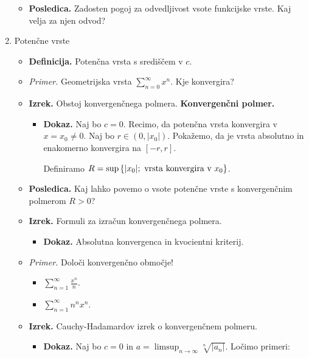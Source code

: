 \begin{enumerate}
\begin{itemize}
        \item \colorbox{orange!30}{\textbf{Posledica.}} Zadosten pogoj za odvedljivost vsote funkcijske vrste. Kaj velja za njen odvod?  
    \end{itemize}
    \item Potenčne vrste
    \begin{itemize}
        \item \colorbox{purple!30}{\textbf{Definicija.}} Potenčna vrsta s središčem v $c$.
        \item \colorbox{yellow!30}{\emph{Primer.}} Geometrijska vrsta $\sum_{n=0}^{\infty} x^n$. Kje konvergira?
        \item \colorbox{blue!30}{\textbf{Izrek.}} Obstoj konvergenčnega polmera. \textbf{Konvergenčni polmer.}
        \begin{itemize}
            \item \colorbox{green!30}{\textbf{Dokaz.}} Naj bo $c = 0$. Recimo, da potenčna vrsta konvergira v $x = x_0 \neq 0$. Naj bo $r \in (0, |x_0|)$. Pokažemo, da je vrsta absolutno in enakomerno konvergira na $[-r, r]$. 
            
            Definiramo $R = \sup \left\{|x_0|; \text{ vrsta konvergira v } x_0\right\}$.
        \end{itemize} 
        \item \colorbox{orange!30}{\textbf{Posledica.}} Kaj lahko povemo o vsote potenčne vrste s konvergenčnim polmerom $R>0$?
        \item \colorbox{blue!30}{\textbf{Izrek.}} Formuli za izračun konvergenčnega polmera.
        \begin{itemize}
            \item \colorbox{green!30}{\textbf{Dokaz.}} Absolutna konvergenca in kvocientni kriterij.
        \end{itemize} 
        \item \colorbox{yellow!30}{\emph{Primer.}} Določi konvergenčno območje!
        \begin{itemize}
            \item $\sum_{n=1}^{\infty} \frac{x^n}{n}$.
            \item $\sum_{n=1}^{\infty} n^n x^n$.
        \end{itemize}

        \newpage
        \item \colorbox{blue!30}{\textbf{Izrek.}} Cauchy-Hadamardov izrek o konvergenčnem polmeru.
        \begin{itemize}
            \item \colorbox{green!30}{\textbf{Dokaz.}} Naj bo $c=0$ in $a = \limsup_{n \to \infty} \sqrt[n]{|a_n|}$. Ločimo primeri:
            

\end{itemize}
\end{itemize}
\end{enumerate}
